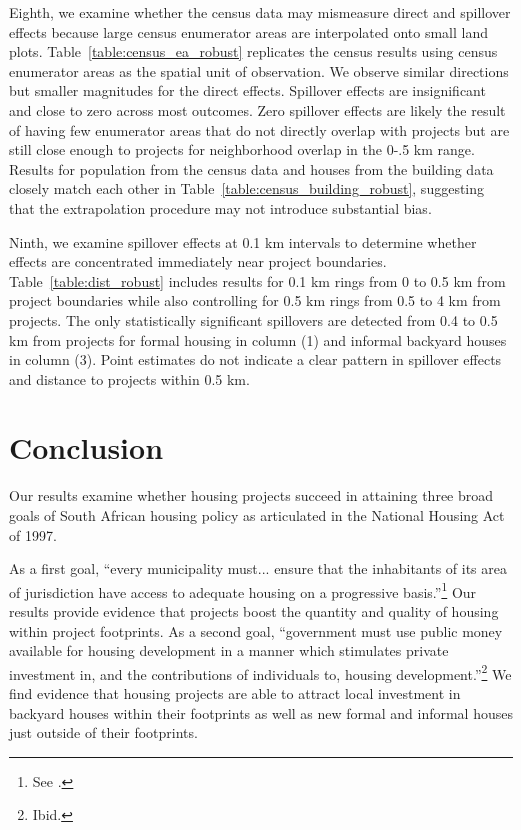 \documentclass[12pt]{article}
\newcommand{\rv}{}
\begin{document}
\rv{Eighth, we examine whether the census data may mismeasure direct and spillover effects because large census enumerator areas are interpolated onto small land plots.  Table~\ref{table:census_ea_robust} replicates the census results using census enumerator areas as the spatial unit of observation.  We observe similar directions but smaller magnitudes for the direct effects.  Spillover effects are insignificant and close to zero across most outcomes.  Zero spillover effects are likely the result of having few enumerator areas that do not directly overlap with projects but are still close enough to projects for neighborhood overlap in the 0-.5 km range.  Results for population from the census data and houses from the building data closely match each other in Table~\ref{table:census_building_robust}, suggesting that the extrapolation procedure may not introduce substantial bias. }


\rv{Ninth, we examine spillover effects at 0.1 km intervals to determine whether effects are concentrated immediately near project boundaries.  Table~\ref{table:dist_robust} includes results for 0.1 km rings from 0 to 0.5 km from project boundaries while also controlling for 0.5 km rings from 0.5 to 4 km from projects.  The only statistically significant spillovers are detected from 0.4 to 0.5 km from projects for formal housing in column (1) and informal backyard houses in column (3).  Point estimates do not indicate a clear pattern in spillover effects and distance to projects within 0.5 km.  }







\section{Conclusion}\label{section:conclusion}


Our results \rv{examine} whether housing projects succeed in attaining three broad goals of South African housing policy as articulated in the National Housing Act of 1997.

As a first goal, ``every municipality must... ensure that the inhabitants of its area of jurisdiction have access to adequate housing on a progressive basis.''\footnote{See \cite{housingact}.}  Our results provide evidence that projects boost the quantity and quality of housing within project footprints.  As a second goal, ``government must use public money available for housing development in a manner which stimulates private investment in, and the contributions of individuals to, housing development.''\footnote{Ibid.}    We find evidence that housing projects are able to attract local investment in backyard houses within their footprints as well as new formal and informal houses just outside of their footprints.  
\end{document}
